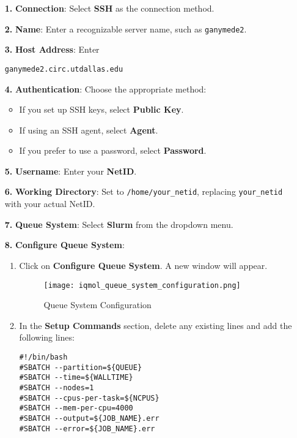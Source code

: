 \documentclass[12pt,letterpaper]{article}
\begin{document}
\begin{enumerate}
    \begin{enumerate}
        \item[\textbf{1.}] \textbf{Connection}: Select \textbf{SSH} as the connection method.
        \item[\textbf{2.}] \textbf{Name}: Enter a recognizable server name, such as \texttt{ganymede2}.
        \item[\textbf{3.}] \textbf{Host Address}: Enter
        \begin{lstlisting}[style=custombash]
ganymede2.circ.utdallas.edu
        \end{lstlisting}
        \item[\textbf{4.}] \textbf{Authentication}: Choose the appropriate method:
        \begin{itemize}
            \item If you set up SSH keys, select \textbf{Public Key}.
            \item If using an SSH agent, select \textbf{Agent}.
            \item If you prefer to use a password, select \textbf{Password}.
        \end{itemize}
        \item[\textbf{5.}] \textbf{Username}: Enter your \textbf{NetID}.
        \item[\textbf{6.}] \textbf{Working Directory}: Set to \texttt{/home/your\_netid}, replacing \texttt{your\_netid} with your actual NetID.
        \item[\textbf{7.}] \textbf{Queue System}: Select \textbf{Slurm} from the dropdown menu.
        \item[\textbf{8.}] \textbf{Configure Queue System}:
        \begin{enumerate}
            \item Click on \textbf{Configure Queue System}. A new window will appear.

            \begin{figure}[H]
                \centering
                \texttt{[image: iqmol\_queue\_system\_configuration.png]}
                \caption{Queue System Configuration}
                \label{fig:iqmol_queue_system_configuration}
            \end{figure}

            \item In the \textbf{Setup Commands} section, delete any existing lines and add the following lines:

            \begin{lstlisting}[style=custombash]
#!/bin/bash
#SBATCH --partition=${QUEUE}
#SBATCH --time=${WALLTIME}
#SBATCH --nodes=1
#SBATCH --cpus-per-task=${NCPUS}
#SBATCH --mem-per-cpu=4000
#SBATCH --output=${JOB_NAME}.err
#SBATCH --error=${JOB_NAME}.err


\end{lstlisting}
\end{enumerate}
\end{enumerate}
\end{enumerate}
\end{document}
